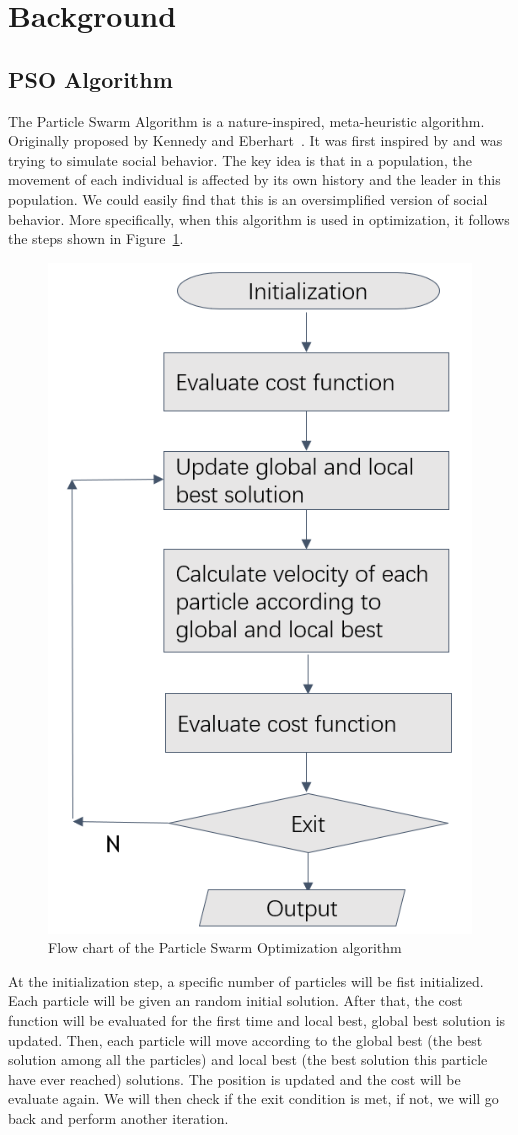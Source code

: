 \documentclass{article}
\begin{document}
\section{Background}
\label{sec:org1be7457}
\subsection{PSO Algorithm}
\label{sec:org448743e}
The Particle Swarm Algorithm is a nature-inspired, meta-heuristic algorithm. Originally proposed by Kennedy and Eberhart~\cite{PSO}. It was first inspired by and was trying to simulate social behavior. The key idea is that in a population, the movement of each individual is affected by its own history and the leader in this population. We could easily find that this is an oversimplified version of social behavior. More specifically, when this algorithm is used in optimization, it follows the steps shown in Figure~\ref{fig:PSO}.
\begin{figure}[H]
\centering
\includegraphics[width=0.4\linewidth]{PSO.PNG}
\caption{Flow chart of the Particle Swarm Optimization algorithm}
\label{fig:PSO}
\end{figure}
At the initialization step, a specific number of particles will be fist initialized. Each particle will be given an random initial solution. After that, the cost function will be evaluated for the first time and local best, global best solution is updated. Then, each particle will move according to the global best (the best solution among all the particles) and local best (the best solution this particle have ever reached) solutions. The position is updated and the cost will be evaluate again. We will then check if the exit condition is met, if not, we will go back and perform another iteration.
\end{document}

